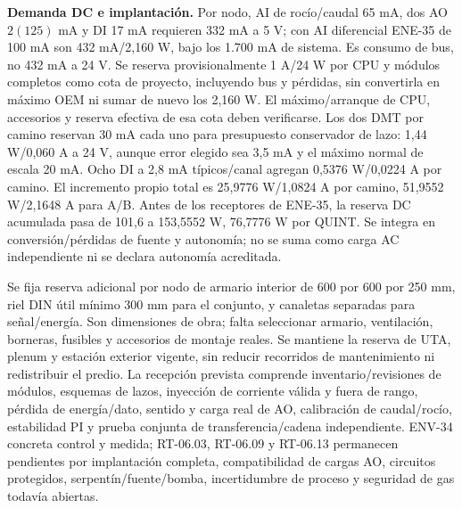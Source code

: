 \textbf{Demanda DC e implantación.} Por nodo, AI de rocío/caudal 65 mA, dos AO $2(125)$ mA y DI 17 mA requieren 332 mA a 5 V; con AI diferencial ENE-35 de 100 mA son 432 mA/2,160 W, bajo los 1.700 mA de sistema. Es consumo de bus, no 432 mA a 24 V. Se reserva provisionalmente 1 A/24 W por CPU y módulos completos como cota de proyecto, incluyendo bus y pérdidas, sin convertirla en máximo OEM ni sumar de nuevo los 2,160 W. El máximo/arranque de CPU, accesorios y reserva efectiva de esa cota deben verificarse. Los dos DMT por camino reservan 30 mA cada uno para presupuesto conservador de lazo: 1,44 W/0,060 A a 24 V, aunque error elegido sea 3,5 mA y el máximo normal de escala 20 mA. Ocho DI a 2,8 mA típicos/canal agregan 0,5376 W/0,0224 A por camino. El incremento propio total es 25,9776 W/1,0824 A por camino, 51,9552 W/2,1648 A para A/B. Antes de los receptores de ENE-35, la reserva DC acumulada pasa de 101,6 a 153,5552 W, 76,7776 W por QUINT. Se integra en conversión/pérdidas de fuente y autonomía; no se suma como carga AC independiente ni se declara autonomía acreditada.

Se fija reserva adicional por nodo de armario interior de 600 por 600 por 250 mm, riel DIN útil mínimo 300 mm para el conjunto, y canaletas separadas para señal/energía. Son dimensiones de obra; falta seleccionar armario, ventilación, borneras, fusibles y accesorios de montaje reales. Se mantiene la reserva de UTA, plenum y estación exterior vigente, sin reducir recorridos de mantenimiento ni redistribuir el predio. La recepción prevista comprende inventario/revisiones de módulos, esquemas de lazos, inyección de corriente válida y fuera de rango, pérdida de energía/dato, sentido y carga real de AO, calibración de caudal/rocío, estabilidad PI y prueba conjunta de transferencia/cadena independiente. ENV-34 concreta control y medida; RT-06.03, RT-06.09 y RT-06.13 permanecen pendientes por implantación completa, compatibilidad de cargas AO, circuitos protegidos, serpentín/fuente/bomba, incertidumbre de proceso y seguridad de gas todavía abiertas.
